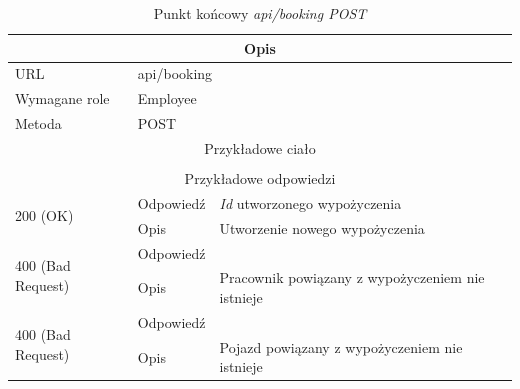 \documentclass[eng,printmode,openany]{mgr}
\begin{document}
	\begin{table}[H]
		\caption{Punkt końcowy \textit{api/booking POST}}
		\begin{tabularx}{\textwidth}{|l|l|X|}
			\hline
			\multicolumn{3}{|c|}{Opis}                         						\\ \hline
			URL                       & \multicolumn{2}{l|}{api/booking} 	    \\ \hline
			Wymagane role             & \multicolumn{2}{l|}{Employee} \\ \hline
			Metoda                    & \multicolumn{2}{l|}{POST} 					\\ \hline
			\multicolumn{3}{|c|}{Przykładowe ciało}         						\\ \hline
			\multicolumn{3}{|c|}{} 		        \\ \hline
			\multicolumn{3}{|c|}{ Przykładowe odpowiedzi}                   		                        \\ \hline
			\multirow{2}{*}{200 (OK)} 			& Odpowiedź     &  \textit{Id} utworzonego wypożyczenia     \\ \cline{2-3} 
			& Opis         	& Utworzenie nowego wypożyczenia     						\\ \hline
			\multirow{2}{*}{400 (Bad Request)} 	& Odpowiedź     &    \\ \cline{2-3} 
			& Opis          & Pracownik powiązany z wypożyczeniem nie istnieje      						    \\ \hline
			\multirow{2}{*}{400 (Bad Request)} 	& Odpowiedź     &    \\ \cline{2-3} 
			& Opis          & Pojazd powiązany z wypożyczeniem nie istnieje      								\\ \hline                                                                
		\end{tabularx}
	\end{table}
	
\end{document}
